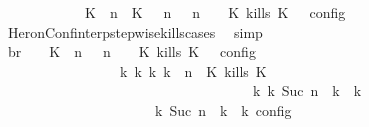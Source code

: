 \begin{isabellebody}
\ \ \ \ \ \ \ \ \ \ {\isasymunion}\ {\isasymlbrakk}\ {\isacharparenleft}{\isacharparenleft}K\ {\isasymUp}\ n{\isacharparenright}\ {\isacharhash}\ {\isacharparenleft}K\ {\isasymnot}{\isasymUp}\ {\isasymge}\ n{\isacharparenright}\ {\isacharhash}\ {\isasymGamma}{\isacharparenright}{\isacharcomma}\ n\ {\isasymturnstile}\ {\isasymPsi}\ {\isasymtriangleright}\ {\isacharparenleft}{\isacharparenleft}K\ kills\ K\ {\isacharhash}\ {\isasymPhi}{\isacharparenright}\ {\isasymrbrakk}\isactrlsub c\isactrlsub o\isactrlsub n\isactrlsub f\isactrlsub i\isactrlsub g{\isacartoucheclose}\isanewline
\ \ \ \ \ \ \ \ \isamarkupfalse%
\ HeronConf{\isacharunderscore}interp{\isacharunderscore}stepwise{\isacharunderscore}kills{\isacharunderscore}cases\ \isamarkupfalse%
\ simp\isanewline
\ \ \ \ \ \ \isamarkupfalse%
\ \isamarkupfalse%
\ br{}{\isacharcolon}\ {\isacartoucheopen}{\isasymrho}\ {\isasymin}\ {\isasymlbrakk}\ {\isacharparenleft}{\isacharparenleft}K\ {\isasymnot}{\isasymUp}\ n{\isacharparenright}\ {\isacharhash}\ {\isasymGamma}{\isacharparenright}{\isacharcomma}\ n\ {\isasymturnstile}\ {\isasymPsi}\ {\isasymtriangleright}\ {\isacharparenleft}{\isacharparenleft}K\ kills\ K\ {\isacharhash}\ {\isasymPhi}{\isacharparenright}\ {\isasymrbrakk}\isactrlsub c\isactrlsub o\isactrlsub n\isactrlsub f\isactrlsub i\isactrlsub g\isanewline
\ \ \ \ \ \ \ \ \ \ \ \ \ \ \ \ {\isasymLongrightarrow}\ {\isasymexists}{\isasymGamma}\isactrlsub k\ {\isasymPsi}\isactrlsub k\ {\isasymPhi}\isactrlsub k\ k{\isachardot}\ {\isacharparenleft}{\isacharparenleft}{\isasymGamma}{\isacharcomma}\ n\ {\isasymturnstile}\ {\isacharparenleft}{\isacharparenleft}K\ kills\ K\ {\isacharhash}\ {\isasymPsi}{\isacharparenright}\ {\isasymtriangleright}\ {\isasymPhi}{\isacharparenright}\isanewline
\ \ \ \ \ \ \ \ \ \ \ \ \ \ \ \ \ \ \ \ \ \ \ \ \ \ \ \ \ \ \ \ \ \ \ \ {\isasymhookrightarrow}\isactrlbsup k\isactrlesup \ {\isacharparenleft}{\isasymGamma}\isactrlsub k{\isacharcomma}\ Suc\ n\ {\isasymturnstile}\ {\isasymPsi}\isactrlsub k\ {\isasymtriangleright}\ {\isasymPhi}\isactrlsub k{\isacharparenright}{\isacharparenright}\isanewline
\ \ \ \ \ \ \ \ \ \ \ \ \ \ \ \ \ \ {\isasymand}\ {\isasymrho}\ {\isasymin}\ {\isasymlbrakk}\ {\isasymGamma}\isactrlsub k{\isacharcomma}\ Suc\ n\ {\isasymturnstile}\ {\isasymPsi}\isactrlsub k\ {\isasymtriangleright}\ {\isasymPhi}\isactrlsub k\ {\isasymrbrakk}\isactrlsub c\isactrlsub o\isactrlsub n\isactrlsub f\isactrlsub i\isactrlsub g{\isacartoucheclose}\isanewline

\end{isabellebody}
